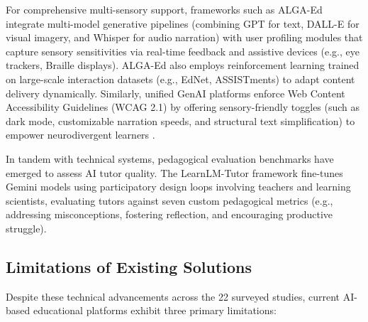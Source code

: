 \documentclass[final,5p,times,twocolumn,authoryear]{elsarticle}
\begin{document}
For comprehensive multi-sensory support, frameworks such as ALGA-Ed \cite{13} integrate multi-model generative pipelines (combining GPT for text, DALL-E for visual imagery, and Whisper for audio narration) with user profiling modules that capture sensory sensitivities via real-time feedback and assistive devices (e.g., eye trackers, Braille displays). ALGA-Ed also employs reinforcement learning trained on large-scale interaction datasets (e.g., EdNet, ASSISTments) to adapt content delivery dynamically. Similarly, unified GenAI platforms enforce Web Content Accessibility Guidelines (WCAG 2.1) by offering sensory-friendly toggles (such as dark mode, customizable narration speeds, and structural text simplification) to empower neurodivergent learners \cite{16}.

In tandem with technical systems, pedagogical evaluation benchmarks have emerged to assess AI tutor quality. The LearnLM-Tutor framework \cite{1} fine-tunes Gemini models using participatory design loops involving teachers and learning scientists, evaluating tutors against seven custom pedagogical metrics (e.g., addressing misconceptions, fostering reflection, and encouraging productive struggle).

\subsection{Limitations of Existing Solutions}
\label{subsec:limitations_existing}

Despite these technical advancements across the 22 surveyed studies, current AI-based educational platforms exhibit three primary limitations:
\end{document}
